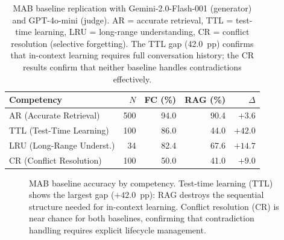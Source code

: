 \begin{table}[!t]
\centering
\caption{MAB baseline replication with Gemini-2.0-Flash-001 (generator)
and GPT-4o-mini (judge).  AR = accurate retrieval, TTL = test-time
learning, LRU = long-range understanding, CR = conflict resolution
(selective forgetting).  The TTL gap (42.0~pp) confirms that in-context
learning requires full conversation history; the CR results confirm that
neither baseline handles contradictions effectively.}
\label{tab:mab-baselines}
\footnotesize
\begin{tabular}{@{}lrrrr@{}}
\toprule
\textbf{Competency} & \textbf{$N$} & \textbf{FC (\%)} & \textbf{RAG (\%)} & \textbf{$\Delta$} \\
\midrule
AR (Accurate Retrieval)     & 500 & 94.0 & 90.4 & $+3.6$ \\
TTL (Test-Time Learning)    & 100 & 86.0 & 44.0 & $+42.0$ \\
LRU (Long-Range Underst.)   &  34 & 82.4 & 67.6 & $+14.7$ \\
CR (Conflict Resolution)    & 100 & 50.0 & 41.0 & $+9.0$ \\
\bottomrule
\end{tabular}
\end{table}

\begin{figure}[!t]
\centering
{}
\caption{MAB baseline accuracy by competency.  Test-time learning (TTL)
shows the largest gap ($+42.0$~pp): RAG destroys the sequential structure
needed for in-context learning.  Conflict resolution (CR) is near chance
for both baselines, confirming that contradiction handling requires
explicit lifecycle management.}
\label{fig:mab-baselines}
\end{figure}

